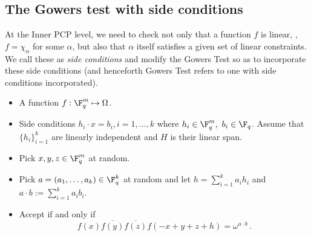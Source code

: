\subsection{The Gowers test with side conditions}

At the Inner PCP level, we need to check not only that a function $f$ is linear, \ie, $f= \chi_\alpha$ for some
$\alpha$, but also that $\alpha$ itself satisfies a given set of linear constraints. We call these
as \emph{side conditions} and modify the Gowers Test so as to incorporate these side conditions (and henceforth Gowers Test refers to one with side conditions incorporated).

\medskip
{}
\begin{itemize}
\item A function $f: \F_q^m \mapsto \Omega$.
\item Side conditions $h_i \cdot x = b_i, i = 1,\ldots, k$ where $h_i \in \F_q^m, \ b_i \in \F_q$. Assume that $\{h_i\}_{i=1}^k$ are linearly independent and  $H$ is their
    linear span.
\end{itemize}
\begin{itemize}
\item Pick $x, y, z \in \F_q^m$ at random.
\item Pick $a = (a_1,\ldots, a_k) \in \F_q^k$ at random and let $h= \sum_{i=1}^k a_i h_i$ and
      $a\cdot b := \sum_{i=1}^k a_i b_i$.
\item Accept if and only if
  $$f(x) \overline{f(y)}\overline{f(z)} f(-x+y+z+h) = \omega^{a\cdot b}\,. $$
\end{itemize}


